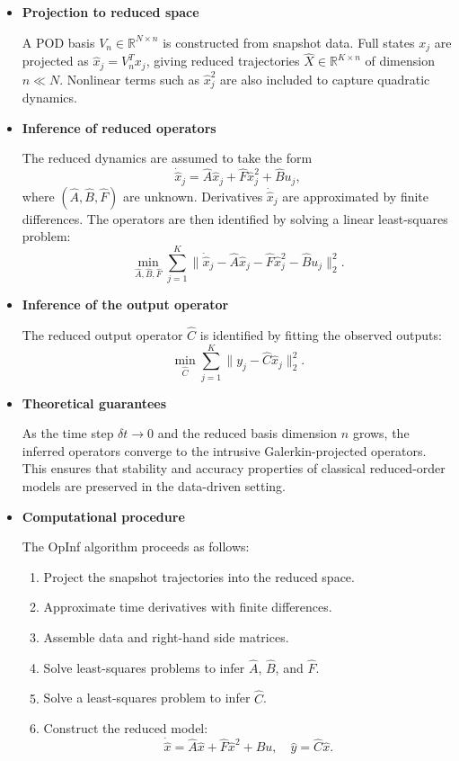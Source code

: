 \documentclass{article}
\begin{document}
\begin{itemize}
    \item \textbf{Projection to reduced space}  
    
    A POD basis $V_n \in \mathbb{R}^{N \times n}$ is constructed from snapshot data.  
    Full states $x_j$ are projected as $\hat{x}_j = V_n^T x_j$, giving reduced 
    trajectories $\hat{X} \in \mathbb{R}^{K \times n}$ of dimension $n \ll N$.  
    Nonlinear terms such as $\hat{x}_j^2$ are also included to capture quadratic dynamics.

    \item \textbf{Inference of reduced operators}  
    
    The reduced dynamics are assumed to take the form
    \[
        \dot{\hat{x}}_j = \hat{A} \hat{x}_j + \hat{F} \hat{x}_j^2 + \hat{B} u_j,
    \]
    where $(\hat{A}, \hat{B}, \hat{F})$ are unknown.  
    Derivatives $\dot{\hat{x}}_j$ are approximated by finite differences.  
    The operators are then identified by solving a linear least-squares problem:
    \[
        \min_{\hat{A}, \hat{B}, \hat{F}}
        \sum_{j=1}^K \| \dot{\hat{x}}_j - \hat{A}\hat{x}_j - \hat{F}\hat{x}_j^2 - \hat{B}u_j \|_2^2.
    \]

    \item \textbf{Inference of the output operator}  
    
    The reduced output operator $\hat{C}$ is identified by fitting the observed outputs:
    \[
        \min_{\hat{C}} \sum_{j=1}^K \| y_j - \hat{C}\hat{x}_j \|_2^2.
    \]

    \item \textbf{Theoretical guarantees}  
    
    As the time step $\delta t \to 0$ and the reduced basis dimension $n$ grows, 
    the inferred operators converge to the intrusive Galerkin-projected operators.  
    This ensures that stability and accuracy properties of classical reduced-order models 
    are preserved in the data-driven setting.

    \item \textbf{Computational procedure}  
    
    The OpInf algorithm proceeds as follows:
    \begin{enumerate}
        \item Project the snapshot trajectories into the reduced space.
        \item Approximate time derivatives with finite differences.
        \item Assemble data and right-hand side matrices.
        \item Solve least-squares problems to infer $\hat{A}$, $\hat{B}$, and $\hat{F}$.
        \item Solve a least-squares problem to infer $\hat{C}$.
        \item Construct the reduced model:
        \[
            \dot{\hat{x}} = \hat{A}\hat{x} + \hat{F}\hat{x}^2 + \hat{B}u, 
            \quad \hat{y} = \hat{C}\hat{x}.
        \]
    \end{enumerate}
\end{itemize}
\end{document}
